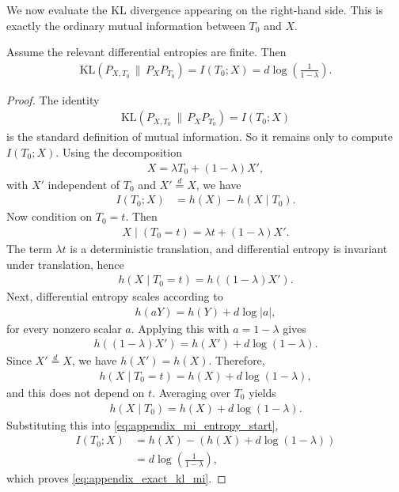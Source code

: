We now evaluate the KL divergence appearing on the right-hand side.
This is exactly the ordinary mutual information between $T_0$ and $X$.

\begin{proposition}
\label{prop:appendix_exact_kl_mi}
Assume the relevant differential entropies are finite.
Then
\begin{align}
    \mathrm{KL}(P_{X,T_0}\,\|\,P_XP_{T_0})
    = I(T_0;X)
    = d\log\left(\frac{1}{1-\lambda}\right).
    \label{eq:appendix_exact_kl_mi}
\end{align}
\end{proposition}

\begin{proof}
The identity
\begin{align*}
    \mathrm{KL}(P_{X,T_0}\,\|\,P_XP_{T_0}) = I(T_0;X)
\end{align*}
is the standard definition of mutual information.
So it remains only to compute $I(T_0;X)$.
Using the decomposition
\begin{align*}
    X = \lambda T_0 + (1-\lambda)X',
\end{align*}
with $X'$ independent of $T_0$ and $X' \stackrel{d}{=} X$, we have
\begin{align}
    I(T_0;X)
     & = h(X) - h(X\mid T_0). 
    \label{eq:appendix_mi_entropy_start}
\end{align}
Now condition on $T_0=t$. Then
\begin{align*}
    X\mid(T_0=t) = \lambda t + (1-\lambda)X'.
\end{align*}
The term $\lambda t$ is a deterministic translation, and differential entropy is invariant under translation, hence
\begin{align*}
    h(X\mid T_0=t) = h\left((1-\lambda)X'\right).
\end{align*}
Next, differential entropy scales according to
\begin{align*}
    h(aY) = h(Y) + d\log|a|,
\end{align*}
for every nonzero scalar $a$.
Applying this with $a=1-\lambda$ gives
\begin{align*}
    h\left((1-\lambda)X'\right)
    = h(X') + d\log(1-\lambda).
\end{align*}
Since $X' \stackrel{d}{=} X$, we have $h(X') = h(X)$. Therefore,
\begin{align*}
    h(X\mid T_0=t)
    = h(X) + d\log(1-\lambda),
\end{align*}
and this does not depend on $t$. Averaging over $T_0$ yields
\begin{align*}
    h(X\mid T_0)
    = h(X) + d\log(1-\lambda).
\end{align*}
Substituting this into \eqref{eq:appendix_mi_entropy_start},
\begin{align*}
    I(T_0;X)
     & = h(X) - \left(h(X) + d\log(1-\lambda)\right) \\
     & = d\log\left(\frac{1}{1-\lambda}\right),
\end{align*}
which proves \eqref{eq:appendix_exact_kl_mi}.
\end{proof}

